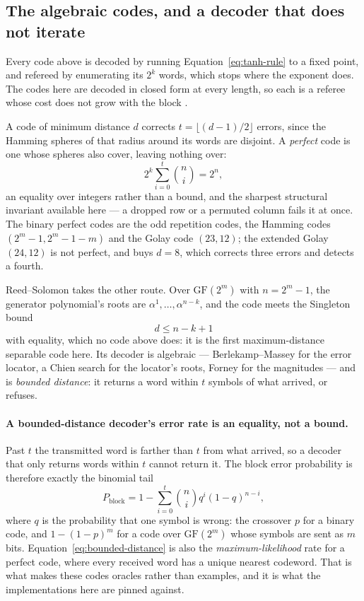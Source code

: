 \documentclass[11pt,a4paper]{article}
\begin{document}
\subsection{The algebraic codes, and a decoder that does not iterate}
\label{sec:ldpc:algebraic}
Every code above is decoded by running Equation~\ref{eq:tanh-rule} to a fixed
point, and refereed by enumerating its $2^{k}$ words, which stops where the
exponent does. The codes here are decoded in closed form at every length, so
each is a referee whose cost does not grow with the block
\citep{blahut2003, mackay2003}.

A code of minimum distance $d$ corrects $t = \lfloor (d-1)/2 \rfloor$ errors,
since the Hamming spheres of that radius around its words are disjoint. A
\emph{perfect} code is one whose spheres also cover, leaving nothing over:
\begin{equation}
  2^{k} \sum_{i=0}^{t} \binom{n}{i} = 2^{n},
  \label{eq:sphere-packing}
\end{equation}
an equality over integers rather than a bound, and the sharpest structural
invariant available here --- a dropped row or a permuted column fails it at
once. The binary perfect codes are the odd repetition codes, the Hamming
codes $(2^{m}-1, 2^{m}-1-m)$ and the Golay code $(23, 12)$; the extended
Golay $(24, 12)$ is not perfect, and buys $d = 8$, which corrects three
errors and detects a fourth.

Reed--Solomon takes the other route. Over $\mathrm{GF}(2^{m})$ with
$n = 2^{m} - 1$, the generator polynomial's roots are
$\alpha^{1}, \dots, \alpha^{n-k}$, and the code meets the Singleton bound
\begin{equation}
  d \leq n - k + 1
  \label{eq:singleton}
\end{equation}
with equality, which no code above does: it is the first maximum-distance
separable code here. Its decoder is algebraic --- Berlekamp--Massey for the
error locator, a Chien search for the locator's roots, Forney for the
magnitudes \citep{blahut2003} --- and is \emph{bounded distance}: it returns
a word within $t$ symbols of what arrived, or refuses.

\paragraph{A bounded-distance decoder's error rate is an equality, not a
bound.} Past $t$ the transmitted word is farther than $t$ from what arrived,
so a decoder that only returns words within $t$ cannot return it. The block
error probability is therefore exactly the binomial tail
\begin{equation}
  P_{\mathrm{block}} = 1 - \sum_{i=0}^{t} \binom{n}{i} q^{i} (1-q)^{n-i},
  \label{eq:bounded-distance}
\end{equation}
where $q$ is the probability that one symbol is wrong: the crossover $p$ for
a binary code, and $1 - (1-p)^{m}$ for a code over $\mathrm{GF}(2^{m})$ whose
symbols are sent as $m$ bits. Equation~\ref{eq:bounded-distance} is also the
\emph{maximum-likelihood} rate for a perfect code, where every received word
has a unique nearest codeword. That is what makes these codes oracles rather
than examples, and it is what the implementations here are pinned against.
\end{document}
